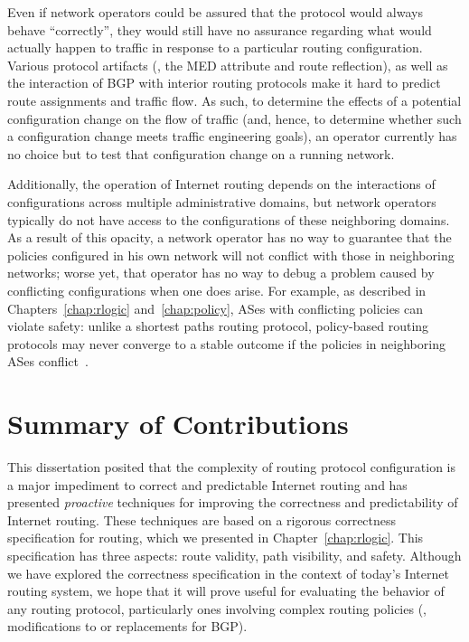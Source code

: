 Even if network operators could be assured that the protocol would
always behave ``correctly'', they would still have no assurance
regarding what would actually happen to traffic in response to a
particular routing configuration.  Various protocol artifacts (\eg, the
MED attribute and route reflection), as well as the interaction of BGP
with interior routing protocols make it hard to predict route
assignments and traffic flow.
As such, to determine the effects of a potential configuration change on
the flow of traffic (and, hence, to determine whether such a
configuration change meets traffic engineering goals), an operator
currently has no choice but to test that configuration change on a
running network.  

Additionally, the operation of Internet routing depends on the
interactions of configurations across multiple administrative domains,
but network operators typically do not have access to the
configurations of these neighboring domains.  As a result of this
opacity, a network operator has no way to guarantee that the policies
configured in his own network will not conflict with those in
neighboring networks; worse yet, that operator has no way to debug a
problem caused by conflicting configurations when one does arise.
For example, as described in Chapters~\ref{chap:rlogic}
and~\ref{chap:policy}, ASes with conflicting policies can 
violate 
safety: unlike a shortest paths routing protocol, policy-based routing
protocols may never converge to a stable outcome if the policies in
neighboring ASes conflict~\cite{Varadhan1996}.  

\section{Summary of Contributions}\label{sec:concl:contrib}

This dissertation posited that the complexity of routing protocol
configuration is a major 
impediment to 
correct and predictable Internet routing and has presented {\em
proactive} techniques for improving the correctness and
predictability of Internet routing.  These techniques are based on 
a rigorous correctness specification for routing, which we presented in
Chapter~\ref{chap:rlogic}.  This specification has three aspects:
route validity, path visibility, and safety.  Although we have explored
the correctness specification in the context of today's Internet routing
system, we hope that it will prove useful for evaluating the behavior of
any routing protocol, particularly ones involving complex routing
policies (\eg, modifications to or replacements for BGP). 

